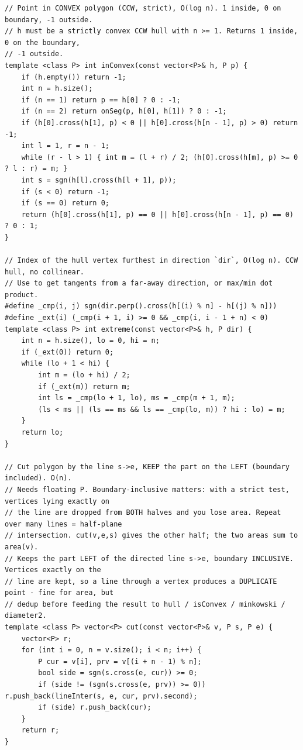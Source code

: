 \documentclass[9pt,a4paper,twocolumn]{extarticle}
\begin{document}
\begin{lstlisting}
// Point in CONVEX polygon (CCW, strict), O(log n). 1 inside, 0 on boundary, -1 outside.
// h must be a strictly convex CCW hull with n >= 1. Returns 1 inside, 0 on the boundary,
// -1 outside.
template <class P> int inConvex(const vector<P>& h, P p) {
    if (h.empty()) return -1;
    int n = h.size();
    if (n == 1) return p == h[0] ? 0 : -1;
    if (n == 2) return onSeg(p, h[0], h[1]) ? 0 : -1;
    if (h[0].cross(h[1], p) < 0 || h[0].cross(h[n - 1], p) > 0) return -1;
    int l = 1, r = n - 1;
    while (r - l > 1) { int m = (l + r) / 2; (h[0].cross(h[m], p) >= 0 ? l : r) = m; }
    int s = sgn(h[l].cross(h[l + 1], p));
    if (s < 0) return -1;
    if (s == 0) return 0;
    return (h[0].cross(h[1], p) == 0 || h[0].cross(h[n - 1], p) == 0) ? 0 : 1;
}

// Index of the hull vertex furthest in direction `dir`, O(log n). CCW hull, no collinear.
// Use to get tangents from a far-away direction, or max/min dot product.
#define _cmp(i, j) sgn(dir.perp().cross(h[(i) % n] - h[(j) % n]))
#define _ext(i) (_cmp(i + 1, i) >= 0 && _cmp(i, i - 1 + n) < 0)
template <class P> int extreme(const vector<P>& h, P dir) {
    int n = h.size(), lo = 0, hi = n;
    if (_ext(0)) return 0;
    while (lo + 1 < hi) {
        int m = (lo + hi) / 2;
        if (_ext(m)) return m;
        int ls = _cmp(lo + 1, lo), ms = _cmp(m + 1, m);
        (ls < ms || (ls == ms && ls == _cmp(lo, m)) ? hi : lo) = m;
    }
    return lo;
}

// Cut polygon by the line s->e, KEEP the part on the LEFT (boundary included). O(n).
// Needs floating P. Boundary-inclusive matters: with a strict test, vertices lying exactly on
// the line are dropped from BOTH halves and you lose area. Repeat over many lines = half-plane
// intersection. cut(v,e,s) gives the other half; the two areas sum to area(v).
// Keeps the part LEFT of the directed line s->e, boundary INCLUSIVE. Vertices exactly on the
// line are kept, so a line through a vertex produces a DUPLICATE point - fine for area, but
// dedup before feeding the result to hull / isConvex / minkowski / diameter2.
template <class P> vector<P> cut(const vector<P>& v, P s, P e) {
    vector<P> r;
    for (int i = 0, n = v.size(); i < n; i++) {
        P cur = v[i], prv = v[(i + n - 1) % n];
        bool side = sgn(s.cross(e, cur)) >= 0;
        if (side != (sgn(s.cross(e, prv)) >= 0)) r.push_back(lineInter(s, e, cur, prv).second);
        if (side) r.push_back(cur);
    }
    return r;
}


\end{lstlisting}
\end{document}
